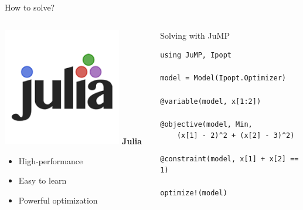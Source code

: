 \documentclass{beamer}
\begin{document}
\begin{frame}{How to solve?}
    \begin{columns}
        \begin{center}
            \includegraphics[width=0.8\textwidth]{fig/Julia.png}  %
            \vspace{1em}
            \textbf{Julia}
            
            \begin{itemize}
                \item High-performance
                \item Easy to learn
                \item Powerful optimization
            \end{itemize}
        \end{center}
        
        \begin{block}{Solving with JuMP}
            \footnotesize
            \begin{verbatim}
using JuMP, Ipopt

model = Model(Ipopt.Optimizer)

@variable(model, x[1:2])

@objective(model, Min, 
    (x[1] - 2)^2 + (x[2] - 3)^2)

@constraint(model, x[1] + x[2] == 1)

optimize!(model)
            \end{verbatim}
        \end{block}
    \end{columns}
\end{frame}
\end{document}
